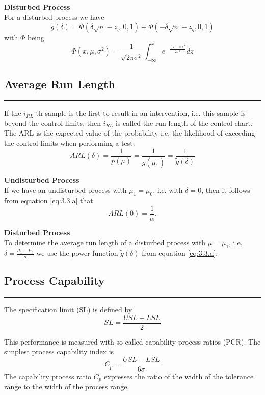 \textbf{Disturbed Process}\\
For a disturbed process we have
\begin{equation}
  \tilde{g}(\delta) = \Phi(\delta\sqrt{n} - z_q, 0, 1) + \Phi(-\delta\sqrt{n} - z_q, 0, 1)
  \label{eq:3.3.d}
\end{equation}
with $\Phi$ being
\begin{equation}
  \Phi(x, \mu, \sigma^2) = \frac{1}{\sqrt{2\pi\sigma^2}}\int^x_{-\infty}e^{-\frac{{(z-\mu)}^2}{2\sigma^2}}dz
\end{equation}


\subsection{Average Run Length}
\noindent\rule[\linienAbstand]{\linewidth}{\linienDicke}
If the $i_{RL}$-th sample is the first to result in an intervention, i.e. this sample is beyond the control limits, then $i_{RL}$ is called the run length of the control chart.\\
The ARL is the expected value of the probability i.e. the likelihood of exceeding the control limits when performing a test.
\begin{equation}
  ARL(\delta) = \frac{1}{p(\mu)} = \frac{1}{g(\mu_1)} = \frac{1}{\tilde{g}(\delta)}
\end{equation}

\textbf{Undisturbed Process}\\
If we have an undisturbed process with $\mu_1 = \mu_0$, i.e. with $\delta = 0$, then it follows from equation \ref{eq:3.3.a} that
\begin{equation}
  ARL(0) = \frac{1}{\alpha}.
\end{equation}

\textbf{Disturbed Process}\\
To determine the average run length of a disturbed process with $\mu = \mu_1$, i.e. $\delta = \frac{\mu_1 - \mu_0}{\sigma}$ we use the power function $\tilde{g}(\delta)$ from equation \ref{eq:3.3.d}.

\subsection{Process Capability}
\noindent\rule[\linienAbstand]{\linewidth}{\linienDicke}
The specification limit (SL) is defined by
\begin{equation}
  SL = \frac{USL + LSL}{2}
\end{equation}

This performance is measured with so-called capability process ratios (PCR). The simplest process capability index is
\begin{equation}
  C_p = \frac{USL - LSL}{6\sigma}
\end{equation}
The capability process ratio $C_p$ expresses the ratio of the width of the tolerance range to the width of the process range.

